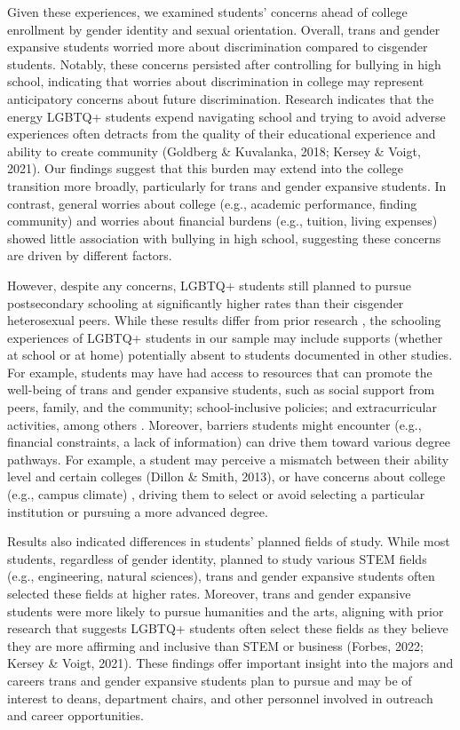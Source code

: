 Given these experiences, we examined students' concerns ahead of college
enrollment by gender identity and sexual orientation. Overall, trans and
gender expansive students worried more about discrimination compared to
cisgender students. Notably, these concerns persisted after controlling
for bullying in high school, indicating that worries about
discrimination in college may represent anticipatory concerns about
future discrimination. Research indicates that the energy LGBTQ+
students expend navigating school and trying to avoid adverse
experiences often detracts from the quality of their educational
experience and ability to create community (Goldberg \& Kuvalanka, 2018;
Kersey \& Voigt, 2021). Our findings suggest that this burden may extend
into the college transition more broadly, particularly for trans and
gender expansive students. In contrast, general worries about college
(e.g., academic performance, finding community) and worries about
financial burdens (e.g., tuition, living expenses) showed little
association with bullying in high school, suggesting these concerns are
driven by different factors.

However, despite any concerns, LGBTQ+ students still planned to pursue
postsecondary schooling at significantly higher rates than their
cisgender heterosexual peers. While these results differ from prior
research \citep{feldman2022a, sansone2019a, wilkinson2021a},
the schooling experiences of LGBTQ+ students in our sample may include
supports (whether at school or at home) potentially absent to students
documented in other studies. For example, students may have had access
to resources that can promote the well-being of trans and gender
expansive students, such as social support from peers, family, and the
community; school-inclusive policies; and extracurricular activities,
among others \citep{fernandes2023a}. Moreover, barriers students might
encounter (e.g., financial constraints, a lack of information) can drive
them toward various degree pathways. For example, a student may perceive
a mismatch between their ability level and certain colleges (Dillon \&
Smith, 2013), or have concerns about college (e.g., campus climate)
\citep{dugan2012a}, driving them to select or avoid selecting a
particular institution or pursuing a more advanced degree.

Results also indicated differences in students' planned fields of study.
While most students, regardless of gender identity, planned to study
various STEM fields (e.g., engineering, natural sciences), trans and
gender expansive students often selected these fields at higher rates.
Moreover, trans and gender expansive students were more likely to pursue
humanities and the arts, aligning with prior research that suggests
LGBTQ+ students often select these fields as they believe they are more
affirming \citep{linley2018a} and inclusive than STEM or business
(Forbes, 2022; Kersey \& Voigt, 2021). These findings offer important
insight into the majors and careers trans and gender expansive students
plan to pursue and may be of interest to deans, department chairs, and
other personnel involved in outreach and career opportunities.

